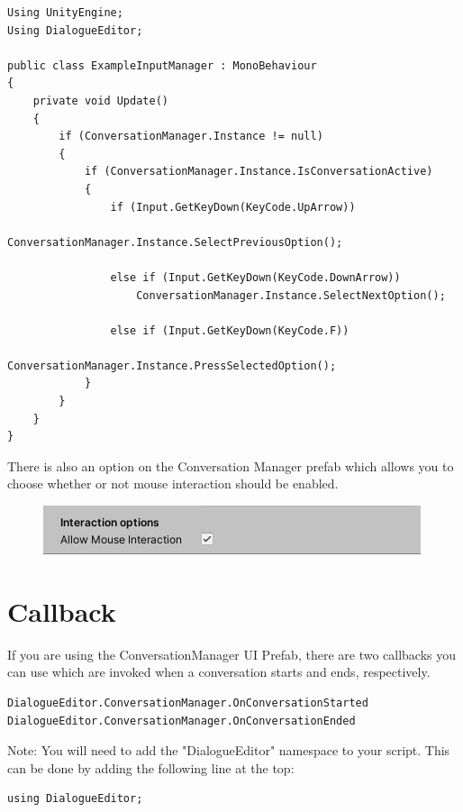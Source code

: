 \documentclass[a4paper,12pt]{article}
\begin{document}
\begin{lstlisting}
Using UnityEngine;
Using DialogueEditor;

public class ExampleInputManager : MonoBehaviour
{
	private void Update()	
	{
		if (ConversationManager.Instance != null)
		{
			if (ConversationManager.Instance.IsConversationActive)
			{
				if (Input.GetKeyDown(KeyCode.UpArrow))
					ConversationManager.Instance.SelectPreviousOption();
					    
				else if (Input.GetKeyDown(KeyCode.DownArrow))
					ConversationManager.Instance.SelectNextOption();
					
				else if (Input.GetKeyDown(KeyCode.F))
					ConversationManager.Instance.PressSelectedOption();
			}
		}
	}
}
\end{lstlisting}
\bigskip

There is also an option on the Conversation Manager prefab which allows you to choose whether or not mouse interaction should be enabled.

\begin{figure}[ht]
\centering
\includegraphics[keepaspectratio]{img/AllowMouseInteraction.png}
\end{figure}

\newpage

\section{Callback}
\hypertarget{_callbacks}{}

If you are using the ConversationManager UI Prefab, there are two callbacks you can use which are invoked when a conversation starts and ends, respectively.
\bigskip

\begin{lstlisting}
DialogueEditor.ConversationManager.OnConversationStarted
DialogueEditor.ConversationManager.OnConversationEnded
\end{lstlisting}
\bigskip

Note: You will need to add the "DialogueEditor" namespace to your script. This can be done by adding the following line at the top:
\bigskip

\begin{lstlisting}
using DialogueEditor;
\end{lstlisting}
\bigskip
\end{document}
